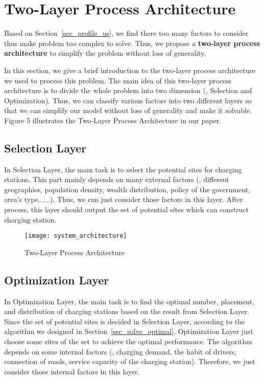 \section{Two-Layer Process Architecture}
\label{sec_system_architecture}
Based on Section~\ref{sec_profile_us}, we find there too many factors to consider thus make problem too complex to solve. 
Thus, we propose a \textbf{two-layer process architecture} to simplify the problem without loss of generality.

In this section, we give a brief introduction to the two-layer process architecture we used to process this problem.
The main idea of this two-layer process architecture is to divide the whole problem into two dimension (\ie, Selection and Optimization).
Thus, we can classify various factors into two different layers so that we can simplify our model without loss of generality and make it solvable.
Figure 5 illustrates the Two-Layer Process Architecture in our paper.
\subsection{Selection Layer}
In Selection Layer,
the main task is to select the potential sites for charging stations.
This part mainly depends on many external factors (\eg, different geographies, population density, wealth distribution, policy of the government, area's type......).
Thus, we can just consider those factors in this layer.
After process, this layer should output the set of potential sites which can construct charging station.

\begin{figure}[!t]
\label{fig_system_architecture}
\centering
\texttt{[image: system\_architecture]}
\caption{Two-Layer Process Architecture}
\end{figure}


\subsection{Optimization Layer}
In Optimization Layer,
the main task is to find the optimal number, placement, and distribution of charging stations based on the result from Selection Layer.
Since the set of potential sites is decided in Selection Layer,
according to the algorithm we designed in Section~\ref{sec_solve_optimal}, 
Optimization Layer just choose some sites of the set to achieve the optimal performance.
The algorithm depends on some internal factors (\eg, charging demand, the habit of drivers, connection of roads, service capacity of the charging station).
Therefore, we just consider those internal factors in this layer.
